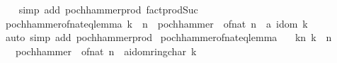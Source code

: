 \begin{isabellebody}
%
\isadelimproof
\ \ %
\endisadelimproof
%
\isatagproof
{}\isamarkupfalse%
\ {\isacharparenleft}{\kern0pt}simp\ add{\isacharcolon}{\kern0pt}\ pochhammer{\isacharunderscore}{\kern0pt}prod\ fact{\isacharunderscore}{\kern0pt}prod{\isacharunderscore}{\kern0pt}Suc{\isacharparenright}{\kern0pt}%
\endisatagproof
{\isafoldproof}%
%
\isadelimproof
\isanewline
%
\endisadelimproof
\isanewline
{}\isamarkupfalse%
\ pochhammer{\isacharunderscore}{\kern0pt}of{\isacharunderscore}{\kern0pt}nat{\isacharunderscore}{\kern0pt}eq{\isacharunderscore}{\kern0pt}{}{\isacharunderscore}{\kern0pt}lemma{\isacharcolon}{\kern0pt}\ {\isachardoublequoteopen}k\ {\isachargreater}{\kern0pt}\ n\ {\isasymLongrightarrow}\ pochhammer\ {\isacharparenleft}{\kern0pt}{\isacharminus}{\kern0pt}\ {\isacharparenleft}{\kern0pt}of{\isacharunderscore}{\kern0pt}nat\ n\ {\isacharcolon}{\kern0pt}{\isacharcolon}{\kern0pt}\ {\isacharprime}{\kern0pt}a{\isacharcolon}{\kern0pt}{\isacharcolon}{\kern0pt}\ idom{\isacharparenright}{\kern0pt}{\isacharparenright}{\kern0pt}\ k\ {\isacharequal}{\kern0pt}\ {}{\isachardoublequoteclose}\isanewline
%
\isadelimproof
\ \ %
\endisadelimproof
%
\isatagproof
{}\isamarkupfalse%
\ {\isacharparenleft}{\kern0pt}auto\ simp\ add{\isacharcolon}{\kern0pt}\ pochhammer{\isacharunderscore}{\kern0pt}prod{\isacharparenright}{\kern0pt}%
\endisatagproof
{\isafoldproof}%
%
\isadelimproof
\isanewline
%
\endisadelimproof
\isanewline
{}\isamarkupfalse%
\ pochhammer{\isacharunderscore}{\kern0pt}of{\isacharunderscore}{\kern0pt}nat{\isacharunderscore}{\kern0pt}eq{\isacharunderscore}{\kern0pt}{}{\isacharunderscore}{\kern0pt}lemma{\isacharprime}{\kern0pt}{\isacharcolon}{\kern0pt}\isanewline
\ \ \ kn{\isacharcolon}{\kern0pt}\ {\isachardoublequoteopen}k\ {\isasymle}\ n{\isachardoublequoteclose}\isanewline
\ \ \ {\isachardoublequoteopen}pochhammer\ {\isacharparenleft}{\kern0pt}{\isacharminus}{\kern0pt}\ {\isacharparenleft}{\kern0pt}of{\isacharunderscore}{\kern0pt}nat\ n\ {\isacharcolon}{\kern0pt}{\isacharcolon}{\kern0pt}\ {\isacharprime}{\kern0pt}a{\isacharcolon}{\kern0pt}{\isacharcolon}{\kern0pt}{\isacharbraceleft}{\kern0pt}idom{\isacharcomma}{\kern0pt}ring{\isacharunderscore}{\kern0pt}char{\isacharunderscore}{\kern0pt}{}{\isacharbraceright}{\kern0pt}{\isacharparenright}{\kern0pt}{\isacharparenright}{\kern0pt}\ k\ {\isasymnoteq}\ {}{\isachardoublequoteclose}\isanewline
%
\isadelimproof
%
\endisadelimproof
%
\isatagproof
{}\isamarkupfalse%

\end{isabellebody}
